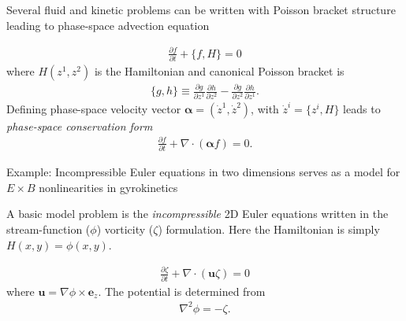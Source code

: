 \documentclass[pdf]{beamer}
\newcommand{\pfrac}[2]{\frac{\partial #1}{\partial #2}}
\newcommand{\mvec}[1]{\mathbf{#1}}
\newcommand{\gvec}[1]{\boldsymbol{#1}}
\newcommand{\eez}{\mvec{e}_z}
\theoremstyle{definition}
\begin{document}
\begin{frame}{Several fluid and kinetic problems can be written with
    Poisson bracket structure leading to phase-space advection
    equation}%

  \begin{align*}
    \pfrac{f}{t} + \{f,H\} = 0
  \end{align*}
  where $H(z^1,z^2)$ is the Hamiltonian and canonical Poisson bracket
  is
  \begin{align*}
    \{g,h\} \equiv \pfrac{g}{z^1}\pfrac{h}{z^2} -
    \pfrac{g}{z^2}\pfrac{h}{z^1}.
  \end{align*}
  Defining phase-space velocity vector $\gvec{\alpha} = (\dot{z}^1,
  \dot{z}^2)$, with $\dot{z}^i = \{z^i,H\}$ leads to \emph{phase-space
    conservation form}
  \begin{align*}
    \pfrac{f}{t} + \nabla\cdot\left(\gvec{\alpha}f\right) = 0.
  \end{align*}
\end{frame}

\begin{frame}{Example: Incompressible Euler equations in two
    dimensions serves as a model for $E\times B$ nonlinearities in
    gyrokinetics}%

  A basic model problem is the \emph{incompressible} 2D Euler
  equations written in the stream-function ($\phi$) vorticity
  ($\zeta$) formulation. Here the Hamiltonian is simply $H(x,y) =
  \phi(x,y)$.

  \begin{align*}
    \pfrac{\zeta}{t} + \nabla\cdot(\mvec{u}\zeta) = 0
  \end{align*}
  where $\mvec{u} = \nabla\phi \times \eez$. The potential is
  determined from
  \begin{align*}
    \nabla^2 \phi = -\zeta.
  \end{align*}
\end{frame}
\end{document}

